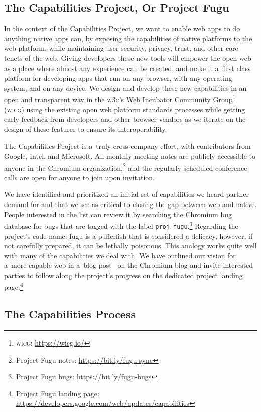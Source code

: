 \documentclass[sigconf]{acmart}
\begin{document}
\subsection{The Capabilities Project, Or Project Fugu}

In the context of the Capabilities Project, we want to enable web apps
to do anything native apps can, by exposing the capabilities of native platforms
to the web platform, while maintaining user security, privacy, trust,
and other core tenets of the web.
Giving developers these new tools will empower the open web
as a place where almost any experience can be created,
and make it a~first class platform for developing apps that run on any browser,
with any operating system, and on any device.
We design and develop these new capabilities in an open and transparent way
in the \textsc{w3c}'s Web Incubator Community
Group\footnote{\textsc{wicg}: \url{https://wicg.io/}} (\textsc{wicg})
using the existing open web platform standards processes
while getting early feedback from developers and other browser vendors
as we iterate on the design of these features to ensure its interoperability.

The Capabilities Project is a~truly cross-company effort,
with contributors from Google, Intel, and Microsoft.
All monthly meeting notes are publicly accessible to anyone in the Chromium
organization,\footnote{Project Fugu notes: \url{https://bit.ly/fugu-sync}}
and the regularly scheduled conference calls are open for anyone to join upon invitation.

We have identified and prioritized an initial set of capabilities
we heard partner demand for and that we see as critical to closing the gap
between web and native.
People interested in the list can review it by searching the Chromium bug database
for bugs that are tagged with the label
\texttt{proj-fugu}.\footnote{Project Fugu bugs: \url{https://bit.ly/fugu-bugs}}
Regarding the project's code name: fugu is a pufferfish that is considered a delicacy, however,  
if not carefully prepared, it can be lethally poisonous. 
This analogy works quite well with many of the capabilities we deal with.
We have outlined our vision for a~more capable web in a~blog post~\cite{lepage18}
on the Chromium blog and invite interested parties to follow along the project's progress
on the dedicated project landing
page.\footnote{Project Fugu landing page:
\url{https://developers.google.com/web/updates/capabilities}}

\subsection{The Capabilities Process}
\end{document}
